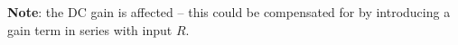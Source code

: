\begin{center}
\end{center}

\textbf{Note}: the DC gain is affected -- this could be compensated for by introducing a gain term in series with input $R$.

\endinput

